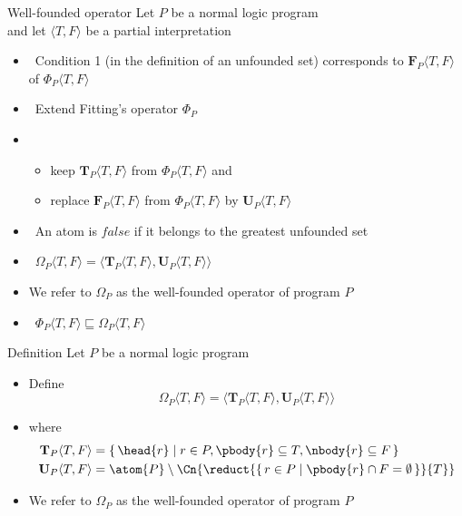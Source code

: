 \begin{frame}{Well-founded operator}
  Let $P$ be a normal logic program\\
  and let $\langle T,F \rangle$ be a partial interpretation
  \medskip
  \begin{itemize}
  \item<2->  \
    Condition 1 (in the definition of an unfounded set)
    corresponds to  ${\mathbf{F}}_P\langle T,F \rangle$
    of $\Phi_P\langle T,F \rangle$
    \medskip
  \item<3->  \
    Extend Fitting's operator $\Phi_P$
  \item<4-> []
    \begin{itemize}\normalsize
    \item keep    ${\mathbf{T}}_P\langle T,F \rangle$ from $\Phi_P\langle T,F \rangle$ and
    \item replace ${\mathbf{F}}_P\langle T,F \rangle$ from $\Phi_P\langle T,F \rangle$ by
      ${\mathbf{U}}_P\langle T,F \rangle$
    \end{itemize}
    \medskip
  \item<only@5 >  \ An atom is $\mathit{false}$ if it belongs to the greatest unfounded set
  \item<only@7->  \
    \(
    \Omega_P\langle T,F \rangle
    =
    \langle {\mathbf{T}}_P\langle T,F \rangle, {\mathbf{U}}_P\langle T,F \rangle\rangle
    \)
  \item<only@8->[] We refer to $\Omega_P$ as the \alert{well-founded operator} of program $P$
    \smallskip
  \item<only@9->  \
    \(
    \Phi_P  \langle T,F \rangle
    \sqsubseteq
    \Omega_P\langle T,F \rangle
    \)
  \end{itemize}
\end{frame}
\begin{frame}{Definition}
  \bigskip
  Let $P$ be a normal logic program
  \medskip
  \begin{itemize}
  \item Define
    \[
      \Omega_P\langle T,F \rangle
      =
      \langle
      {\mathbf{T}}_P\langle T,F \rangle,
      {\mathbf{U}}_P\langle T,F \rangle
      \rangle
    \]
  \item []
    where
    \begin{align*}
      {\mathbf{T}}_P\langle T,F \rangle
      & =
      \{\, \head{r} \mid r \in P, \pbody{r} \subseteq T, \nbody{r} \subseteq F \,\}
      \\
      {\mathbf{U}}_P\langle T,F \rangle
      & =
      \atom{P} \setminus
      \Cn{\reduct{\{\,r \in P \mid \pbody{r} \cap F = \emptyset\,\}}{T}}
    \end{align*}
\item We refer to $\Omega_P$ as the \alert{well-founded operator} of program $P$
\end{itemize}
\end{frame}
